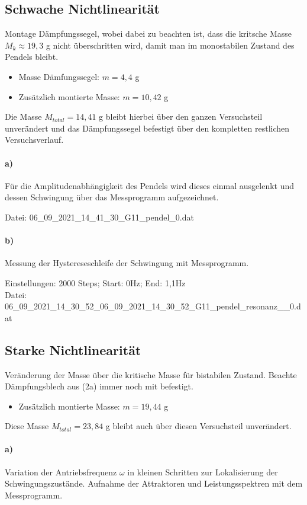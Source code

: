\subsection*{Schwache Nichtlinearität}
\label{sub:weakLin}
Montage Dämpfungssegel, wobei dabei zu beachten ist, dass die kritsche Masse $M_k\approx19,3$ g nicht überschritten wird, damit man im monostabilen Zustand des Pendels bleibt.
\begin{itemize}
    \item Masse Dämfungssegel: $m=4,4$ g
    \item Zusätzlich montierte Masse: $m = 10,42$ g
\end{itemize}
Die Masse $M_{total}= 14,41$ g bleibt hierbei über den ganzen Versuchsteil unverändert und das Dämpfungssegel befestigt über den kompletten restlichen Versuchsverlauf.
\paragraph{a)}
Für die Amplitudenabhängigkeit des Pendels wird dieses einmal ausgelenkt und dessen Schwingung über das Messprogramm aufgezeichnet.

Datei: 06\_09\_2021\_14\_41\_30\_G11\_pendel\_0.dat

\paragraph{b)}
Messung der Hystereseschleife der Schwingung mit Messprogramm.

Einstellungen: 2000 Steps; Start: 0Hz; End: 1,1Hz\\
Datei: 06\_09\_2021\_14\_30\_52\_06\_09\_2021\_14\_30\_52\_G11\_pendel\_resonanz\_\_0.dat\\

\subsection*{Starke Nichtlinearität}
\label{sub:strongLin}
Veränderung der Masse über die kritische Masse für bistabilen Zustand. Beachte Dämpfungsblech aus (2a) immer noch mit befestigt.
\begin{itemize}
    \item Zusätzlich montierte Masse: $m = 19,44$ g
\end{itemize}
Diese Masse $M_{total}=23,84$ g bleibt auch über diesen Versuchsteil unverändert.

\paragraph{a)}
Variation der Antriebsfrequenz $\omega$ in kleinen Schritten zur Lokalisierung der Schwingungszustände. Aufnahme der Attraktoren und Leistungsspektren mit dem Messprogramm.

